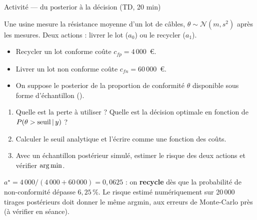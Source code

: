 \begin{frame}{Activité --- du posterior à la décision (TD, 20 min)}
\small
\begin{abox}[Énoncé]
Une usine mesure la résistance moyenne d'un lot de câbles,
$\theta \sim \mathcal{N}(m, s^2)$ après les mesures. Deux actions :
livrer le lot ($a_0$) ou le recycler ($a_1$).
\begin{itemize}
  \item Recycler un lot conforme coûte $c_{fp} = 4\,000$~€.
  \item Livrer un lot non conforme coûte $c_{fn} = 60\,000$~€.
  \item On suppose le posterior de la proportion de conformité $\theta$
        disponible sous forme d'échantillon ().
\end{itemize}
\vspace{1mm}
\begin{enumerate}
  \item Quelle est la perte à utiliser ? Quelle est la décision optimale en
        fonction de $P(\theta > \text{seuil} \,\vert\, y)$ ?
  \item Calculer le seuil analytique et l'écrire comme une fonction des coûts.
  \item Avec un échantillon postérieur simulé, estimer le risque des deux
        actions et vérifier $\operatorname*{arg\,min}$.
\end{enumerate}
\end{abox}
\vspace{1mm}
\begin{solbox}
$a^\star = 4\,000/(4\,000+60\,000) = 0{,}0625$ : on \textbf{recycle} dès que la
probabilité de non-conformité dépasse $6{,}25\,\%$. Le risque estimé
numériquement sur 20\,000 tirages postérieurs doit donner le même argmin,
aux erreurs de Monte-Carlo près (à vérifier en séance).
\end{solbox}
\end{frame}
